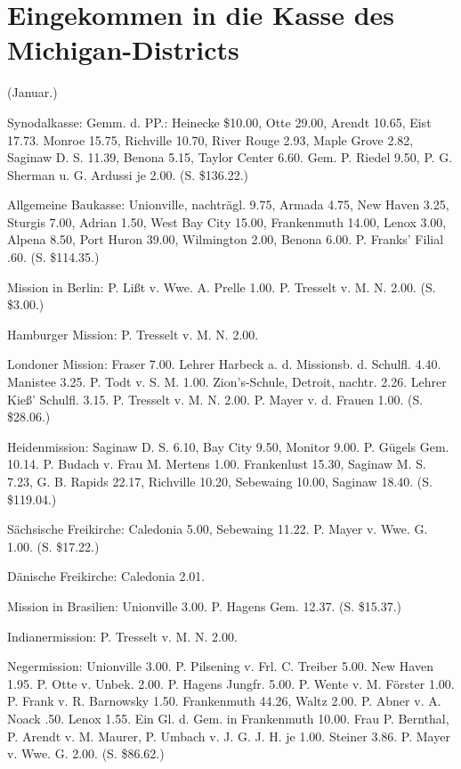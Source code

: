 \chapter[Kasse des Michigan-Districts]{Eingekommen in die Kasse des Michigan-Districts}

(Januar.)

Synodalkasse: Gemm. d. PP.: Heinecke \$10.00, Otte 29.00, Arendt 10.65, Eist 17.73. Monroe 15.75, Richville 10.70, River Rouge 2.93, Maple Grove 2.82, Saginaw D. S. 11.39, Benona 5.15, Taylor Center 6.60. Gem. P. Riedel 9.50, P. G. Sherman u. G. Ardussi je 2.00. (S. \$136.22.)

Allgemeine Baukasse: Unionville, nachträgl. 9.75, Armada 4.75, New Haven 3.25, Sturgis 7.00, Adrian 1.50, West Bay City 15.00, Frankenmuth 14.00, Lenox 3.00, Alpena 8.50, Port Huron 39.00, Wilmington 2.00, Benona 6.00. P. Franks’ Filial .60. (S. \$114.35.)

Mission in Berlin: P. Lißt v. Wwe. A. Prelle 1.00. P. Tresselt v. M. N. 2.00. (S. \$3.00.)

Hamburger Mission: P. Tresselt v. M. N. 2.00.

Londoner Mission: Fraser 7.00. Lehrer Harbeck a. d. Missionsb. d. Schulfl. 4.40. Manistee 3.25. P. Todt v. S. M. 1.00. Zion’s-Schule, Detroit, nachtr. 2.26. Lehrer Kieß’ Schulfl. 3.15. P. Tresselt v. M. N. 2.00. P. Mayer v. d. Frauen 1.00. (S. \$28.06.)

Heidenmission: Saginaw D. S. 6.10, Bay City 9.50, Monitor 9.00. P. Gügels Gem. 10.14. P. Budach v. Frau M. Mertens 1.00. Frankenlust 15.30, Saginaw M. S. 7.23, G. B. Rapids 22.17, Richville 10.20, Sebewaing 10.00, Saginaw 18.40. (S. \$119.04.)

Sächsische Freikirche: Caledonia 5.00, Sebewaing 11.22. P. Mayer v. Wwe. G. 1.00. (S. \$17.22.)

Dänische Freikirche: Caledonia 2.01.

Mission in Brasilien: Unionville 3.00. P. Hagens Gem. 12.37. (S. \$15.37.)

Indianermission: P. Tresselt v. M. N. 2.00.

Negermission: Unionville 3.00. P. Pilsening v. Frl. C. Treiber 5.00. New Haven 1.95. P. Otte v. Unbek. 2.00. P. Hagens Jungfr. 5.00. P. Wente v. M. Förster 1.00. P. Frank v. R. Barnowsky 1.50. Frankenmuth 44.26, Waltz 2.00. P. Abner v. A. Noack .50. Lenox 1.55. Ein Gl. d. Gem. in Frankenmuth 10.00. Frau P. Bernthal, P. Arendt v. M. Maurer, P. Umbach v. J. G. J. H. je 1.00. Steiner 3.86. P. Mayer v. Wwe. G. 2.00. (S. \$86.62.)

